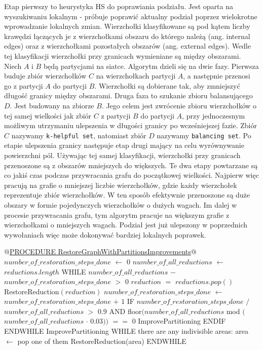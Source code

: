 Etap pierwszy to heurystyka HS do poprawiania podziału.
Jest oparta na wyszukiwaniu lokalnym -
próbuje poprawić aktualny podział poprzez wielokrotne wprowadzanie lokalnych zmian.
Wierzchołki klasyfikowane są
pod kątem liczby krawędzi łączących je z wierzchołkami obszaru do którego należą (ang. internal edges) oraz z wierzchołkami
pozostałych obszarów (ang. external edges).
Wedle tej klasyfikacji wierzchołki przy granicach wymieniane są między obszarami.
Niech $A$ i $B$ będą partycjami na siatce.
Algorytm dzieli się na dwie fazy.
Pierwsza buduje zbiór wierzchołków $C$ na wierzchołkach partycji $A$, a następnie przenosi go z partycji $A$ do partycji $B$.
Wierzchołki są dobierane tak, aby zmniejszyć długość granicy między obszarami.
Druga faza to szukanie zbioru balansującego $D$.
Jest budowany na zbiorze $B$.
Jego celem jest zwrócenie zbioru wierzchołków o tej samej wielkości jak zbiór $C$ z partycji $B$ do partycji $A$,
przy jednoczesnym możliwym utrzymaniu ulepszenia w długości granicy po wcześniejszej fazie.
Zbiór $C$ nazywamy \texttt{k-helpful set}, natomiast zbiór $D$ nazywamy \texttt{balancing set}.
Po etapie ulepszenia granicy następuje etap drugi mający na celu wyrównywanie powierzchni pól.
Używając tej samej klasyfikacji, wierzchołki przy granicach przenoszone są z obszarów mniejszych do większych.
Te dwa etapy powtarzane są co jakiś czas podczas przywracania grafu do początkowej wielkości.
Najpierw więc pracują na grafie o mniejszej liczbie wierzchołków, gdzie każdy wierzchołek reprezentuje zbiór wierzchołków.
W ten sposób efektywnie przenoszone są duże obszary w formie pojedynczych wierzchołków o dużych wagach.
Im dalej w procesie przywracania grafu, tym algorytm pracuje na większym grafie z wierzchołkami o mniejszych wagach.
Podział jest już ulepszony w poprzednich wywołaniach więc może dokonywać bardziej lokalnych poprawek.
\newpage
\begin{pseudocode}
@\underline{PROCEDURE RestoreGraphWithPartitionsImprovements}@
  $number\_of\_restoration\_steps\_done$ $\leftarrow$ $0$
  $number\_of\_all\_reductions$ $\leftarrow$ $reductions$.$length$
  WHILE $number\_of\_all\_reductions$ $-$ $number\_of\_restoration\_steps\_done$ $>$ $0$
    $reduction$ $=$ $reductions$.$pop()$
    RestoreReduction$(reduction)$
    $number\_of\_restoration\_steps\_done$ $\leftarrow$ $number\_of\_restoration\_steps\_done$ $+$ $1$
    IF $number\_of\_restoration\_steps\_done$ $/$ $number\_of\_all\_reductions$ $>$ $0.9$ AND
       floor$(number\_of\_all\_reductions$ mod $($$number\_of\_all\_reductions$ $\cdot$ $0.03))$ $==$ $0$
      ImprovePartitioning
    ENDIF
  ENDWHILE
  ImprovePartitioning
  WHILE there are any indivisible areas:
    area $\leftarrow$ pop one of them
    RestoreReduction(area)
  ENDWHILE
\end{pseudocode}
